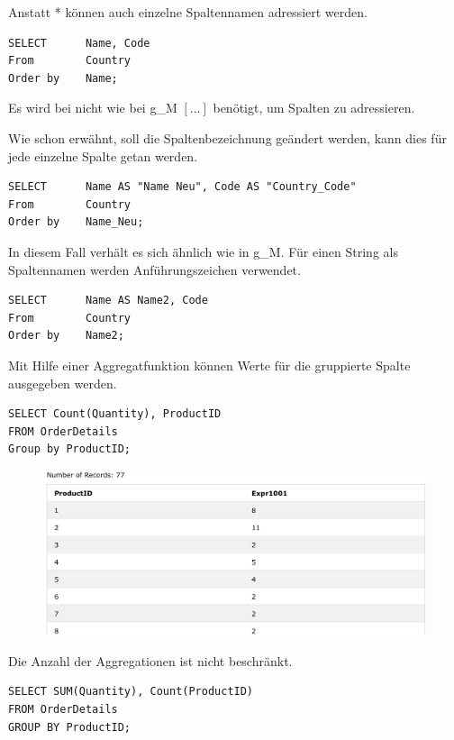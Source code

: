 Anstatt * können auch einzelne Spaltennamen adressiert werden.

\begin{lstlisting}[style=SQL]
SELECT		Name, Code
From		Country
Order by	Name;
\end{lstlisting} 
Es wird bei nicht wie bei \gls{g_M} $[...]$ benötigt, um Spalten zu adressieren.

Wie schon erwähnt, soll die Spaltenbezeichnung geändert werden, kann dies für jede einzelne Spalte getan werden.


\begin{lstlisting}[style=SQL]
SELECT		Name AS "Name Neu", Code AS "Country_Code"
From		Country
Order by	Name_Neu;
\end{lstlisting}
In diesem Fall verhält es sich ähnlich wie in \gls{g_M}. Für einen String als Spaltennamen werden Anführungszeichen verwendet.

\begin{lstlisting}[style=SQL]
SELECT		Name AS Name2, Code 
From		Country
Order by	Name2;
\end{lstlisting} 

Mit Hilfe einer Aggregatfunktion können Werte für die gruppierte Spalte ausgegeben werden.

\begin{lstlisting}[style=SQL]
SELECT Count(Quantity), ProductID
FROM OrderDetails
Group by ProductID;
\end{lstlisting}

\begin{figure}[H]
	\centering
	\includegraphics[scale = 0.3]{attachment/chapter_3/Scc051}
	\caption{}
	\label{fig:Scc051}
\end{figure}

Die Anzahl der Aggregationen ist nicht beschränkt.

\begin{lstlisting}[style=SQL]
SELECT SUM(Quantity), Count(ProductID)
FROM OrderDetails
GROUP BY ProductID;
\end{lstlisting}

